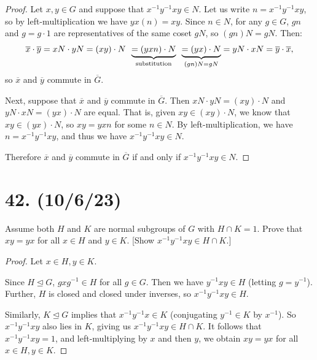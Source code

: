 \documentclass{article}
\begin{document}
\begin{proof}
    Let $x, y \in G$ and suppose that $x^{-1}y^{-1}xy \in N$. Let us write $n = x^{-1}y^{-1}xy$, so by left-multiplication we have $yx(n) = xy$. Since $n \in N$, for any $g \in G$, $gn$ and $g = g \cdot 1$ are representatives of the same coset $gN$, so $(gn)N = gN$. Then:
    \begin{align*}
        \overline{x} \cdot \overline{y} = xN \cdot yN = (xy) \cdot N \hspace{0.5em} \underbrace{= (yxn) \cdot N}_{\text{substitution}} \hspace{0.5em} \underbrace{= (yx) \cdot N}_{(gn)N = gN} = yN \cdot xN = \overline{y} \cdot \overline{x},
    \end{align*}
    so $\overline{x}$ and $\overline{y}$ commute in $\overline{G}$.

    Next, suppose that $\overline{x}$ and $\overline{y}$ commute in $\overline{G}$. Then $xN \cdot yN = (xy) \cdot N$ and $yN \cdot xN = (yx) \cdot N$ are equal. That is, given $xy \in (xy) \cdot N$, we know that $xy \in (yx) \cdot N$, so $xy = yxn$ for some $n \in N$. By left-multiplication, we have $n = x^{-1}y^{-1}xy$, and thus we have $x^{-1}y^{-1}xy \in N$.

    Therefore $\overline{x}$ and $\overline{y}$ commute in $\overline{G}$ if and only if $x^{-1}y^{-1}xy \in N$.
\end{proof}

\section*{42. (10/6/23)}

Assume both $H$ and $K$ are normal subgroups of $G$ with $H \cap K = 1$. Prove that $xy = yx$ for all $x \in H$ and $y \in K$. [Show $x^{-1}y^{-1}xy \in H \cap K$.]

\begin{proof}
    Let $x \in H, y \in K$.
    
    Since $H \unlhd G$, $gxg^{-1} \in H$ for all $g \in G$. Then we have $y^{-1}xy \in H$ (letting $g = y^{-1}$). Further, $H$ is closed and closed under inverses, so $x^{-1}y^{-1}xy \in H$.

    Similarly, $K \unlhd G$ implies that $x^{-1}y^{-1}x \in K$ (conjugating $y^{-1} \in K$ by $x^{-1}$). So $x^{-1}y^{-1}xy$ also lies in $K$, giving us $x^{-1}y^{-1}xy \in H \cap K$. It follows that $x^{-1}y^{-1}xy = 1$, and left-multiplying by $x$ and then $y$, we obtain $xy = yx$ for all $x \in H, y \in K$.
\end{proof}
\end{document}
